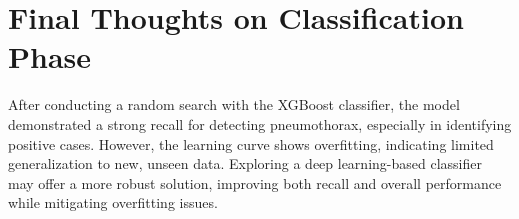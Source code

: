 \documentclass{article}
\begin{document}
\section*{Final Thoughts on Classification Phase}
After conducting a random search with the XGBoost classifier, the model demonstrated a strong recall for detecting pneumothorax, especially in identifying positive cases. However, the learning curve shows overfitting, indicating limited generalization to new, unseen data. Exploring a deep learning-based classifier may offer a more robust solution, improving both recall and overall performance while mitigating overfitting issues.
\end{document}
